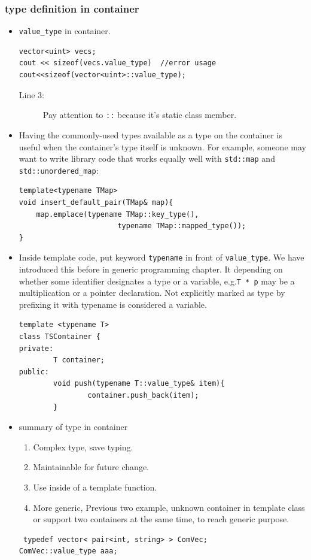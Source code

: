\documentclass[a4paper,11pt,twoside]{book}
\begin{document}
\subsubsection{type definition in container}
\begin{itemize}
\item \texttt{value\_type} in container.
\begin{lstlisting}[numbers=none]
vector<uint> vecs;
cout << sizeof(vecs.value_type)  //error usage
cout<<sizeof(vector<uint>::value_type);
\end{lstlisting}
\begin{description}
	\item[Line 3:] Pay attention to \texttt{::} because it's static class member.
\end{description}

\item Having the commonly-used types available as a type on the container is useful when the container's type itself is unknown. For example, someone may want to write library code that works equally well with \texttt{std::map} and \texttt{std::unordered\_map}:
\begin{lstlisting}[numbers=none]
template<typename TMap>
void insert_default_pair(TMap& map){
    map.emplace(typename TMap::key_type(),
                       typename TMap::mapped_type());
}
\end{lstlisting}

\item Inside template code, put keyword \texttt{typename} in front of \texttt{value\_type}. We have introduced this before in generic programming chapter. It depending on whether some identifier designates a type or a variable, e.g.\texttt{T * p} may be a multiplication or a pointer declaration. Not explicitly marked as type by prefixing it with typename is considered a variable.

\begin{lstlisting}[numbers=none]
template <typename T>
class TSContainer {
private:
        T container;
public:
        void push(typename T::value_type& item){
                container.push_back(item);
        }
\end{lstlisting}


\item summary of type in container
\begin{enumerate}
\item Complex type, save typing.
\item Maintainable for future change.
\item Use inside of a template function.
\item More generic, Previous two example, unknown container in template class or support two containers at the same time, to reach generic purpose.
\end{enumerate}
\begin{lstlisting}
 typedef vector< pair<int, string> > ComVec;
ComVec::value_type aaa;


\end{lstlisting}
\end{itemize}
\end{document}
